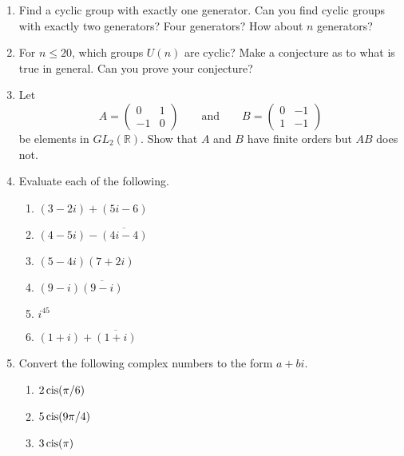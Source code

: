{\begin{enumerate}
 
\item
Find a cyclic group with exactly one generator.  Can you find cyclic
groups with exactly two generators?  Four generators?  How about $n$
generators?
 
 
\item
For $n \leq 20$, which groups $U(n)$ are cyclic?  Make a conjecture as
to what is true in general.  Can you prove your conjecture?  
 
 
\item
Let
\[
A=
\begin{pmatrix}
0 & 1 \\
-1 & 0
\end{pmatrix}
\qquad \text{and} \qquad
B=
\begin{pmatrix}
0 & -1 \\
1 & -1
\end{pmatrix}
\]
be elements in $GL_2( {\mathbb R} )$. Show that $A$ and $B$ have finite
orders but $AB$ does not. 
 
 
\item
Evaluate each of the following.
\begin{multicols}{2}
\begin{enumerate}
 
\item
$(3-2i)+ (5i-6)$

 
\item
 $(4-5i)-\overline{(4i -4)}$
 
 \item
$(5-4i)(7+2i)$
 
\item
$(9-i) \overline{(9-i)}$
 
 \item
$i^{45}$

\item
$(1+i)+\overline{(1+i)}$
 
\end{enumerate}
\end{multicols}
 
 
 \item   %
Convert the following complex numbers to the form $a + bi$.
\begin{multicols}{2}
\begin{enumerate}

 \item
$2 \operatorname{cis}(\pi / 6 )$

 
 \item
$5 \operatorname{cis}(9\pi/4)$

\item
$3 \operatorname{cis}(\pi)$
 

\end{enumerate}
\end{multicols}
\end{enumerate}}
